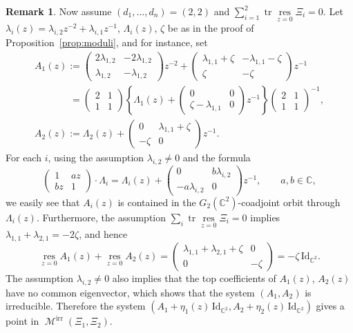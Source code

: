 \documentclass[pdftex]{sigma}
\numberwithin{equation}{section}
\theoremstyle{definition}
\newtheorem{Remark}[Theorem]{Remark}
\newcommand{\propref}[1]{Proposition~\ref{#1}}
\newcommand{\C}{\mathbb{C}} %
\newcommand{\tr}{\operatorname{tr}}
\newcommand{\unit}{\mathrm{Id}}
\newcommand{\res}{\operatorname*{res}}
\newcommand{\Mirr}{\operatorname{\mathcal{M}}^\mathrm{irr}}
\begin{document}
\begin{Remark}
Now assume $(d_1,\dots ,d_n)=(2,2)$ and
$\sum\limits_{i=1}^2 \tr \res\limits_{z=0} \Xi_i =0$.
Let $\lambda_i(z)=\lambda_{i,2}z^{-2} + \lambda_{i,1}z^{-1}$,
$\Lambda_i(z)$, $\zeta$ be as in the proof of \propref{prop:moduli},
and for instance, set
\begin{gather*}
A_1(z)  :=
\begin{pmatrix}
2 \lambda_{1,2} & -2\lambda_{1,2} \\
\lambda_{1,2} & -\lambda_{1,2}
\end{pmatrix}z^{-2} +
\begin{pmatrix}
\lambda_{1,1} + \zeta & -\lambda_{1,1} -\zeta \\
\zeta & -\zeta
\end{pmatrix}z^{-1} \\
\phantom{A_1(z) }{}\;
= \begin{pmatrix}
2 & 1 \\ 1 & 1
\end{pmatrix}
\left\{ \Lambda_1(z) +
\begin{pmatrix}
0 & 0 \\
\zeta -\lambda_{1,1} & 0
\end{pmatrix}z^{-1}
\right\}
\begin{pmatrix}
2 & 1 \\ 1 & 1
\end{pmatrix}^{-1},\\
A_2(z) := \Lambda_2(z) + \begin{pmatrix}
0 & \lambda_{1,1} +\zeta \\
-\zeta & 0
\end{pmatrix}z^{-1}.
\end{gather*}
For each $i$, using the assumption $\lambda_{i,2} \neq 0$
and the formula
\[
\begin{pmatrix}
1 & az \\ bz & 1
\end{pmatrix} \cdot \Lambda_i =
\Lambda_i(z) +
\begin{pmatrix}
0 & b\lambda_{i,2} \\ -a\lambda_{i,2} & 0
\end{pmatrix}z^{-1},
\qquad a,b \in \C,
\]
we easily see that $A_i(z)$ is contained in
the $G_2(\C^2)$-coadjoint orbit through $\Lambda_i(z)$.
Furthermore, the assumption $\sum_i \tr \res\limits_{z=0} \Xi_i =0$
implies
$\lambda_{1,1} + \lambda_{2,1} = -2\zeta$,
and hence
\[
\res_{z=0}A_1(z) + \res_{z=0}A_2(z) =
\begin{pmatrix}
\lambda_{1,1}+\lambda_{2,1} + \zeta & 0 \\
0 & -\zeta
\end{pmatrix}
= -\zeta\,\unit_{\C^2}.
\]
The assumption $\lambda_{i,2} \neq 0$ also implies that
the top coef\/f\/icients of $A_1(z)$, $A_2(z)$ have
no common eigenvector, which shows that
the system $(A_1,A_2)$ is irreducible.
Therefore the system
$(A_1+\eta_1(z)\,\unit_{\C^2},A_2+\eta_2(z)\,\unit_{\C^2})$
gives a point in $\Mirr(\Xi_1,\Xi_2)$.
\end{Remark}
\end{document}
